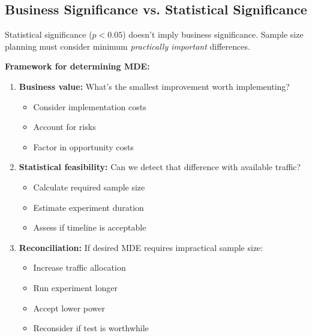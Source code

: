\subsection{Business Significance vs. Statistical Significance}

Statistical significance ($p < 0.05$) doesn't imply business significance. Sample size planning must consider minimum \textit{practically important} differences.

\textbf{Framework for determining MDE:}

\begin{enumerate}
    \item \textbf{Business value:} What's the smallest improvement worth implementing?
    \begin{itemize}
        \item Consider implementation costs
        \item Account for risks
        \item Factor in opportunity costs
    \end{itemize}

    \item \textbf{Statistical feasibility:} Can we detect that difference with available traffic?
    \begin{itemize}
        \item Calculate required sample size
        \item Estimate experiment duration
        \item Assess if timeline is acceptable
    \end{itemize}

    \item \textbf{Reconciliation:} If desired MDE requires impractical sample size:
    \begin{itemize}
        \item Increase traffic allocation
        \item Run experiment longer
        \item Accept lower power
        \item Reconsider if test is worthwhile
    \end{itemize}
\end{enumerate}

